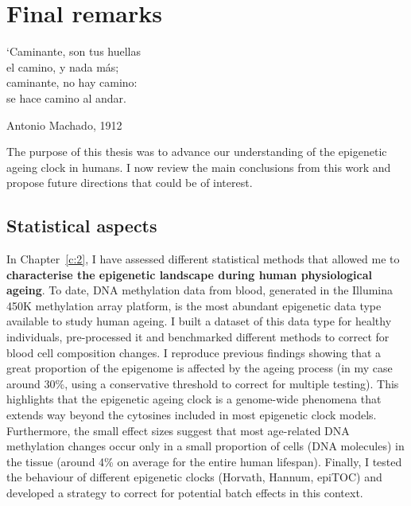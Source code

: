 
\chapter{Final remarks} \label{c:5}

\ifpdf
	\graphicspath{{Chapter5/Figs/pdf/}}
\else
	\graphicspath{{Chapter5/Figs/svg/}}
\fi

\epigraph{`Caminante, son tus huellas \\ el camino, y nada más; \\ caminante, no hay camino: \\ se hace camino al andar.}{Antonio Machado, 1912 \cite{Machado}}

\bigskip

The purpose of this thesis was to advance our understanding of the epigenetic ageing clock in humans. I now review the main conclusions from this work and propose future directions that could be of interest.


\section{Statistical aspects}

\bigskip

In Chapter~\ref{c:2}, I have assessed different statistical methods that allowed me to \textbf{characterise the epigenetic landscape during human physiological ageing}. To date, DNA methylation data from blood, generated in the Illumina 450K methylation array platform, is the most abundant epigenetic data type available to study human ageing. I built a dataset of this data type for healthy individuals, pre-processed it and benchmarked different methods to correct for blood cell composition changes. I reproduce previous findings showing that a great proportion of the epigenome is affected by the ageing process (in my case around 30\%, using a conservative threshold to correct for multiple testing). This highlights that the epigenetic ageing clock is a genome-wide phenomena that extends way beyond the cytosines included in most epigenetic clock models. Furthermore, the small effect sizes suggest that most age-related DNA methylation changes occur only in a small proportion of cells (DNA molecules) in the tissue (around 4\% on average for the entire human lifespan). Finally, I tested the behaviour of different epigenetic clocks (Horvath, Hannum, epiTOC) and developed a strategy to correct for potential batch effects in this context.

